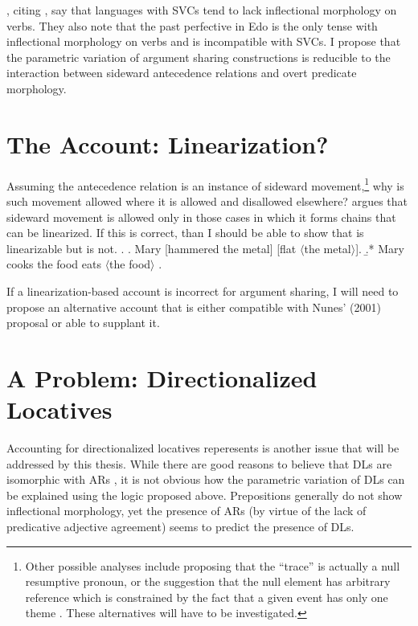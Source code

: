 \documentclass[letterpaper]{article}
\begin{document}
\textcite{bakerstewart1999double}, citing \textcite{dechaine1993diss}, say that languages with SVCs tend to lack inflectional morphology on verbs.
They also note that the past perfective in Edo is the only tense with inflectional morphology on verbs and is incompatible with SVCs.
I propose \parencite[contrary to][]{bakerstewart1999double} that the parametric variation of argument sharing constructions is reducible to the interaction between sideward antecedence relations and overt predicate morphology.

\section{The Account: Linearization?}
Assuming the antecedence relation is an instance of sideward movement,\footnote{
  Other possible analyses include proposing that the ``trace'' is actually a null resumptive pronoun, or the suggestion that the null element has arbitrary reference which is constrained by the fact that a given event has only one theme \parencite{pietroski2005events}.
  These alternatives will have to be investigated.
} why is such movement allowed where it is allowed and disallowed elsewhere?
\textcite{nunes2001sideward} argues that sideward movement is allowed only in those cases in which it forms chains that can be linearized.
If this is correct, than I should be able to show that \Next[a] is linearizable but \Next[b] is not.
\ex. 
\a. Mary [hammered the metal] [flat $\langle$the metal$\rangle$]. 
\b.* Mary cooks the food eats $\langle$the food$\rangle$
\z.

If a linearization-based account is incorrect for argument sharing, I will need to propose an alternative account that is either compatible with Nunes' (2001) proposal or able to supplant it.

\section{A Problem: Directionalized Locatives}
Accounting for directionalized locatives reperesents is another issue that will be addressed by this thesis.
While there are good reasons to believe that DLs are isomorphic with ARs \textcite{milway2015generals}, it is not obvious how the parametric variation of DLs can be explained using the logic proposed above.
Prepositions generally do not show inflectional morphology, yet the presence of ARs (by virtue of the lack of predicative adjective agreement) seems to predict the presence of DLs.
\end{document}
